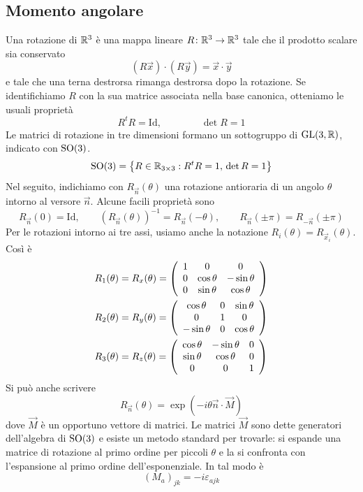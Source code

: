 \documentclass[a4paper, 11pt]{article}
\newcommand{\id}{\mathrm{Id}}
\begin{document}
\subsection{Momento angolare}
Una rotazione di $\mathbb{R}^3$ è una mappa lineare $R\colon\mathbb{R}^3\to\mathbb{R} ^3$ tale che il prodotto scalare sia conservato
\[(R\vec{x})\cdot(R\vec{y})=\vec{x}\cdot\vec{y}\]
e tale che una terna destrorsa rimanga destrorsa dopo la rotazione. Se identifichiamo $R$ con la sua matrice associata nella base canonica, otteniamo le usuali proprietà
\[R^tR=\id,\qquad\qquad\det R=1\]
Le matrici di rotazione in tre dimensioni formano un sottogruppo di $\mathrm{GL}(3,\mathbb{R})$, indicato con $\mathrm{SO}(3)$.
\[\mathrm{SO}(3)=\left\{R\in\mathbb{R}_{3\times 3}:R^tR=1,\,\det R=1\right\}\]
Nel seguito, indichiamo con $R_\vec{n}(\theta)$ una rotazione antioraria di un angolo $\theta$ intorno al versore $\vec{n}$. Alcune facili proprietà sono
\[R_\vec{n}(0)=\id,\qquad(R_{\vec{n}}(\theta))^{-1}=R_\vec{n}(-\theta),\qquad R_{\vec{n}}(\pm\pi)=R_{-\vec{n}}(\pm\pi)\] Per le rotazioni intorno ai tre assi, usiamo anche la notazione $R_i(\theta)=R_{\vec{x}_i}(\theta)$. Così è
\begin{align*}
	R_1(\theta)&=R_x(\theta)=\left(\begin{array}{c c c}
		1&0&0\\0&\cos\theta&-\sin\theta\\0&\sin\theta&\cos\theta
	\end{array}\right)\\
	R_2(\theta)&=R_y(\theta)=\left(\begin{array}{c c c}
		\cos\theta&0&\sin\theta\\0&1&0\\-\sin\theta&0&\cos\theta
	\end{array}\right)\\
	R_3(\theta)&=R_z(\theta)=\left(\begin{array}{c c c}
		\cos\theta&-\sin\theta&0\\\sin\theta&\cos\theta&0\\0&0&1
	\end{array}\right)
\end{align*}
Si può anche scrivere
\[R_\vec{n}(\theta)=\exp(-i\theta\vec{n}\cdot\vec{M})\]
dove $\vec{M}$ è un opportuno vettore di matrici. Le matrici $\vec{M}$ sono dette generatori dell'algebra di $\mathrm{SO}(3)$ e esiste un metodo standard per trovarle: si espande una matrice di rotazione al primo ordine per piccoli $\theta$ e la si confronta con l'espansione al primo ordine dell'esponenziale. In tal modo è 
\[(M_a)_{jk}=-i\varepsilon_{ajk}\]
\end{document}
